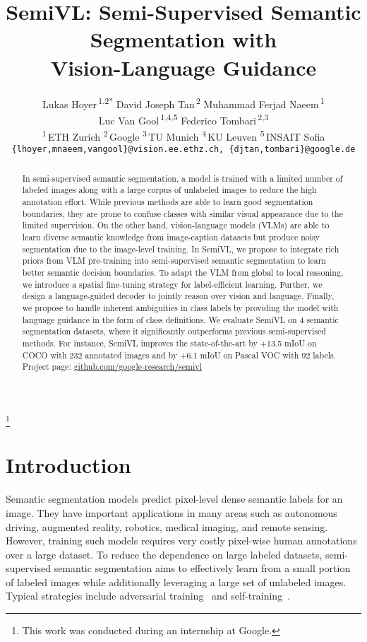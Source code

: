 \documentclass[10pt,twocolumn,letterpaper]{article}
\title{SemiVL: Semi-Supervised Semantic Segmentation with\\ Vision-Language Guidance}
\author{
   Lukas Hoyer\,\textsuperscript{1,2*} \quad
   David Joseph Tan\,\textsuperscript{2} \quad
   Muhammad Ferjad Naeem\,\textsuperscript{1} \\
   Luc Van Gool\,\textsuperscript{1,4,5} \quad
   Federico Tombari\,\textsuperscript{2,3} \\
   \textsuperscript{1}\,ETH Zurich \enskip
   \textsuperscript{2}\,Google \enskip
   \textsuperscript{3}\,TU Munich \enskip
   \textsuperscript{4}\,KU Leuven \enskip
   \textsuperscript{5}\,INSAIT Sofia\\
  {\tt\small \{lhoyer,mnaeem,vangool\}@vision.ee.ethz.ch, \{djtan,tombari\}@google.de}
}
\begin{document}
\maketitle
\begin{abstract}
In semi-supervised semantic segmentation, a model is trained with a limited number of labeled images along with a large corpus of unlabeled images to reduce the high annotation effort. While previous methods are able to learn good segmentation boundaries, they are prone to confuse classes with similar visual appearance due to the limited supervision. On the other hand, vision-language models (VLMs) are able to learn diverse semantic knowledge from image-caption datasets but produce noisy segmentation due to the image-level training. In SemiVL, we propose to integrate rich priors from VLM pre-training into semi-supervised semantic segmentation to learn better semantic decision boundaries. To adapt the VLM from global to local reasoning, we introduce a spatial fine-tuning strategy for label-efficient learning. Further, we design a language-guided decoder to jointly reason over vision and language. Finally, we propose to handle inherent ambiguities in class labels by providing the model with language guidance in the form of class definitions. We evaluate SemiVL on 4 semantic segmentation datasets, where it significantly outperforms previous semi-supervised methods. For instance, SemiVL improves the state-of-the-art by +13.5 mIoU on COCO with 232 annotated images and by +6.1 mIoU on Pascal VOC with 92 labels. Project page: \href{https://github.com/google-research/semivl}{github.com/google-research/semivl}
\end{abstract}




 \vspace{-2mm}
{\let\thefootnote\relax\footnote{{This work was conducted during an internship at Google.}}} 
\vspace{-2mm}
\section{Introduction}

Semantic segmentation models predict pixel-level dense semantic labels for an image. 
They have important applications in many areas such as autonomous driving, augmented reality, robotics, medical imaging, and remote sensing.
However, training such models requires very costly pixel-wise human annotations over a large dataset.
To reduce the dependence on large labeled datasets, semi-supervised semantic segmentation aims to effectively learn from a small portion of labeled images while additionally leveraging a large set of unlabeled images.
Typical strategies include adversarial training~\cite{souly2017semi,mittal2019semi} and self-training~\cite{yang2022st++,sohn2020fixmatch,yang2023revisiting}.
\end{document}
